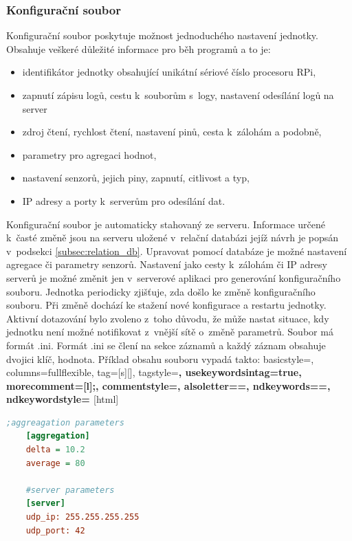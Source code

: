 \subsubsection*{Konfigurační soubor}
Konfigurační soubor poskytuje možnost jednoduchého nastavení jednotky. Obsahuje veškeré důležité informace pro běh programů a to je:
\begin{itemize}
    \item identifikátor jednotky obsahující unikátní sériové číslo procesoru RPi,
    \item zapnutí zápisu logů, cestu k~souborům s~logy, nastavení odesílání logů na server
    \item zdroj čtení, rychlost čtení, nastavení pinů, cesta k~zálohám a podobně,
    \item parametry pro agregaci hodnot,
    \item nastavení senzorů, jejich piny, zapnutí, citlivost a typ,
    \item IP adresy a porty k~serverům pro odesílání dat.
\end{itemize}
Konfigurační soubor je automaticky stahovaný ze serveru. Informace určené k~časté změně jsou na serveru uložené v~relační databázi jejíž návrh je popsán v~podsekci \ref{subsec:relation_db}. Upravovat pomocí databáze je možné nastavení agregace či parametry senzorů. Nastavení jako cesty k~zálohám či IP adresy serverů je možné změnit jen v~serverové aplikaci pro generování konfiguračního souboru. Jednotka periodicky zjišťuje, zda došlo ke změně konfiguračního souboru. Při změně dochází ke stažení nové konfigurace a restartu jednotky. Aktivní dotazování bylo zvoleno z~toho důvodu, že může nastat situace, kdy jednotku není možné notifikovat z~vnější sítě o~změně parametrů. Soubor má formát .ini. Formát .ini se člení na sekce záznamů a každý záznam obsahuje dvojici klíč, hodnota. Příklad obsahu souboru vypadá takto: 
{
    basicstyle=\ttfamily\small,
    columns=fullflexible,
    tag=[s]{[]},
    tagstyle=\color{blue}\bfseries,
    usekeywordsintag=true,
    morecomment=[l]{;},
    commentstyle=\color{gray}\ttfamily,
    alsoletter={=},
    ndkeywords={=},
    ndkeywordstyle=\color{green}\bfseries
}[html]
 \begin{lstlisting}[language={Ini}]
    ;aggreagation parameters
    [aggregation]
    delta = 10.2
    average = 80

    #server parameters
    [server]
    udp_ip: 255.255.255.255
    udp_port: 42
    \end{lstlisting}

